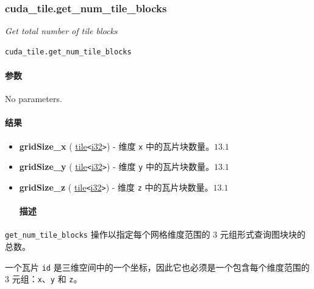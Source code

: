 \documentclass{article}
\begin{document}
\subsubsection{cuda\_tile.get\_num\_tile\_blocks}

\textit{Get total number of tile blocks}


\begin{lstlisting}
cuda_tile.get_num_tile_blocks
\end{lstlisting}

\paragraph{参数}

No parameters.



\paragraph{结果}

\begin{itemize}
\item \textbf{gridSize\_x} ( \href{https://docs.nvidia.com/cuda/tile-ir/latest/sections/types.html#type-tile}{tile}\texttt{<}\href{https://docs.nvidia.com/cuda/tile-ir/latest/sections/types.html#subsection-element-types}{i32}\texttt{>}) - 维度 \texttt{x} 中的瓦片块数量。$\boxed{13.1}$
\item \textbf{gridSize\_y} ( \href{https://docs.nvidia.com/cuda/tile-ir/latest/sections/types.html#type-tile}{tile}\texttt{<}\href{https://docs.nvidia.com/cuda/tile-ir/latest/sections/types.html#subsection-element-types}{i32}\texttt{>}) - 维度 \texttt{y} 中的瓦片块数量。$\boxed{13.1}$
\item \textbf{gridSize\_z} ( \href{https://docs.nvidia.com/cuda/tile-ir/latest/sections/types.html#type-tile}{tile}\texttt{<}\href{https://docs.nvidia.com/cuda/tile-ir/latest/sections/types.html#subsection-element-types}{i32}\texttt{>}) - 维度 \texttt{z} 中的瓦片块数量。$\boxed{13.1}$


\paragraph{描述}

\end{itemize}
\texttt{get\_num\_tile\_blocks} 操作以指定每个网格维度范围的 3 元组形式查询图块块的总数。


一个瓦片 \texttt{id} 是三维空间中的一个坐标，因此它也必须是一个包含每个维度范围的 3 元组：\texttt{x}、\texttt{y} 和 \texttt{z}。
\end{document}

